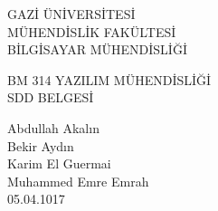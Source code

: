 \begin{titlepage}
   \begin{center}
      \begin{large}
         \vspace*{0.5cm}
         GAZİ ÜNİVERSİTESİ \\
         MÜHENDİSLİK FAKÜLTESİ \\
         BİLGİSAYAR MÜHENDİSLİĞİ

         \vfill
         BM 314 YAZILIM MÜHENDİSLİĞİ \\
         SDD BELGESİ

         \vfill
         Abdullah Akalın\\Bekir Aydın\\Karim El Guermai\\Muhammed Emre Emrah\\

         \vfill
         \vspace{0.5cm}
         05.04.1017
      \end{large}
   \end{center}
\end{titlepage}
